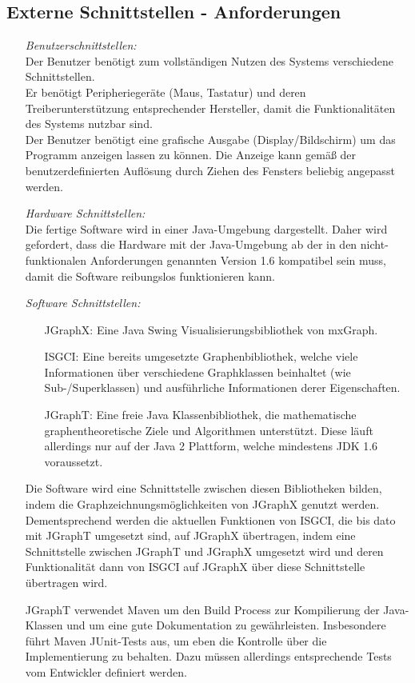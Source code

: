 \documentclass[11pt,a4paper]{article}
\begin{document}
	\subsection{Externe Schnittstellen - Anforderungen} %
	\begin{itemize}
	\item[] \textit{Benutzerschnittstellen:}\\
	Der Benutzer benötigt zum vollständigen Nutzen des Systems verschiedene Schnittstellen.\\
	Er benötigt Peripheriegeräte (Maus, Tastatur) und deren Treiberunterstützung entsprechender Hersteller, damit die Funktionalitäten des Systems nutzbar sind.\\
	Der Benutzer benötigt eine grafische Ausgabe (Display/Bildschirm) um das Programm anzeigen lassen zu können. Die Anzeige kann gemäß der benutzerdefinierten Auflösung durch Ziehen des Fensters beliebig angepasst werden.
	\item[] \textit{Hardware Schnittstellen:}\\
	Die fertige Software wird in einer Java-Umgebung dargestellt. Daher wird gefordert, dass die Hardware mit der Java-Umgebung ab der in den nicht-funktionalen Anforderungen genannten Version 1.6 kompatibel sein muss, damit die Software reibungslos funktionieren kann.
	\item[] \textit{Software Schnittstellen:}
	\begin{itemize}
	\item[JGraphX:] Eine Java Swing Visualisierungsbibliothek von mxGraph. 
	\item[ISGCI:] Eine bereits umgesetzte Graphenbibliothek, welche viele Informationen über verschiedene Graphklassen beinhaltet (wie Sub-/Superklassen) und ausführliche Informationen derer Eigenschaften.
	\item[JGraphT:] Eine freie Java Klassenbibliothek, die mathematische graphentheoretische Ziele und Algorithmen unterstützt. Diese läuft allerdings nur auf der Java 2 Plattform, welche mindestens JDK 1.6 voraussetzt.
 	\end{itemize}
	Die Software wird eine Schnittstelle zwischen diesen %
Bibliotheken bilden, indem die Graphzeichnungsmöglichkeiten von JGraphX genutzt werden. Dementsprechend werden die aktuellen Funktionen von ISGCI, die bis dato mit JGraphT umgesetzt sind, auf JGraphX übertragen, indem eine Schnittstelle zwischen JGraphT und JGraphX umgesetzt wird und deren Funktionalität dann von ISGCI auf JGraphX über diese Schnittstelle übertragen wird. 
	
	JGraphT verwendet Maven um den Build Process zur Kompilierung der Java-Klassen und um eine gute Dokumentation zu gewährleisten. Insbesondere führt Maven JUnit-Tests aus, um eben die Kontrolle über die Implementierung zu behalten. Dazu müssen allerdings entsprechende Tests vom Entwickler definiert werden.
	\end{itemize}
	
\end{document}
